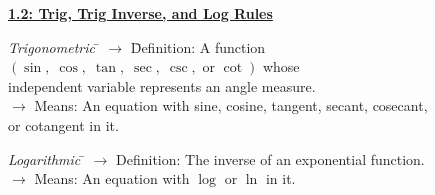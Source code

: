 \textbf{\underline{\large{1.2: Trig, Trig Inverse, and Log Rules}}} \par

\begin{tcolorbox}[definition]
    \begin{tabbing}
        \textit{Trigonometric} \= $\rightarrow$ \= Definition: A function $(\sin, \; \cos, \; \tan, \; \sec, \; \csc, \text{ or } \cot)$ whose \\ 
        \> \> independent variable represents an angle measure. \\[5.5pt]
        \> $\rightarrow$ Means: An equation with sine, cosine, tangent, secant, cosecant, \\ 
        \> \> or cotangent in it.
    \end{tabbing} \vspace{11pt}
    \begin{tabbing}
        \textit{Logarithmic} \= $\rightarrow$ Definition: The inverse of an exponential function. \\[5.5pt]
        \> $\rightarrow$ Means: An equation with $\log$ or $\ln$ in it.
    \end{tabbing}
\end{tcolorbox}


